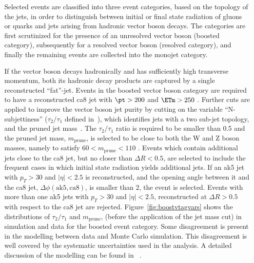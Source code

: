 Selected events are classified into three event categories, based on the topology of the jets, in order to distinguish between 
initial or final state radiation of gluons or quarks and jets arising from hadronic vector boson decays.
The categories are first scrutinized for the presence of an unresolved
vector boson (boosted category), subsequently for a resolved vector
boson (resolved category), and finally the remaining events are collected into the monojet category. 

If the vector boson decays hadronically and has sufficiently high transverse momentum, both its hadronic
decay products are captured by a single reconstructed ``fat''-jet.
Events in the boosted vector boson category are required to
have a reconstructed ca8 jet with $\pt>200$ \gev and  $\ETm>250$ \gev.  Further cuts are applied to improve the vector boson jet
purity by cutting on the variable ``N-subjettiness'' ($\tau_2/\tau_1$ defined in~\cite{Thaler:2010tr,Thaler:2011gf}), which identifies jets with a 
two sub-jet topology, and the pruned jet mass~\cite{Ellis:2009me}. The $\tau_2/\tau_1$ ratio
is required to be smaller than 0.5 and the pruned jet mass, $m_{\mathrm{prune}}$, is selected to
be close to both the W and Z boson masses, namely to satisfy $60<m_{\mathrm{prune}}<110$ \gev.   
Events which contain additional jets close to the ca8 jet, but no closer than $\Delta R < 0.5$,
are selected to include the frequent cases in which initial state radiation yields additional jets. 
If an ak5 jet with $p_T>30$ and $|\eta|<2.5$ is reconstructed, and the opening angle between it 
and the ca8 jet, $\Delta\phi(\mathrm{ak5,ca8})$, is smaller than 2, the event is selected. Events with more than one ak5 jets 
with $p_T>30$ \gev and $|\eta|<2.5$, reconstructed at $\Delta R> 0.5$ with respect to the ca8 jet 
are rejected.
Figure~\ref{fig:boostvtagvars} shows the distributions of $\tau_2/\tau_1$ and $m_{\mathrm{prune}}$, (before the application 
of the jet mass cut) in simulation and data for the boosted event category. Some disagreement is present in the modelling between data and Monte Carlo simulation. This disagreement is well covered by the systematic uncertainties used in the analysis. A detailed discussion of the modelling can be found in ~\cite{Khachatryan:2014vla}.  
